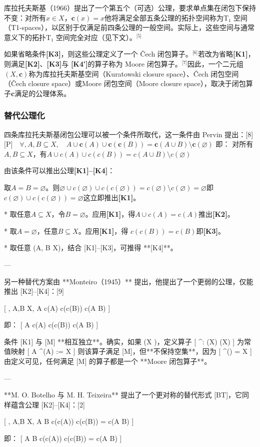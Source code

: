 库拉托夫斯基（1966）提出了一个第五个（可选）公理，要求单点集在闭包下保持不变：对所有$ x \in X $，$\mathbf{c}({x}) = {x}$他将满足全部五条公理的拓扑空间称为T₁ 空间（T1-spaces），以区别于仅满足前四条公理的一般空间。实际上，这些空间与通常意义下的拓扑T₁ 空间完全对应（见下文）。\(^\text{[5]}\)

如果省略条件\textbf{[K3]}，则这些公理定义了一个 Čech 闭包算子。\(^\text{[6]}\)若改为省略\textbf{[K1]}，则满足\textbf{[K2]}、\textbf{[K3]}与 \textbf{[K4′]}的算子称为 Moore 闭包算子。\(^\text{[7]}\)因此，一个二元组$(X, \mathbf{c})$称为库拉托夫斯基空间（Kuratowski closure space）、Čech 闭包空间（Čech closure space）或Moore 闭包空间（Moore closure space），取决于闭包算子$\mathbf{c}$满足的公理体系。
\subsubsection{替代公理化}
四条库拉托夫斯基闭包公理可以被一个条件所取代，这一条件由 Pervin 提出：[8]
$\text{[P]}\quad \forall, A,B \subseteq X, \quad A \cup \mathbf{c}(A) \cup \mathbf{c}(\mathbf{c}(B)) = \mathbf{c}(A \cup B) \setminus \mathbf{c}(\varnothing)$
即：
对所有$A, B \subseteq X$，有$A \cup c(A) \cup c(c(B)) = c(A \cup B) \setminus c(\varnothing)$

由该条件可以推出公理\textbf{[K1]–[K4]}：

取$A = B = \varnothing$。则$\varnothing \cup c(\varnothing) \cup c(c(\varnothing)) = c(\varnothing) \setminus c(\varnothing) = \varnothing$即$c(\varnothing) \cup c(c(\varnothing)) = \varnothing$这立即推出\textbf{[K1]}。

* 取任意$A \subseteq X$，令$B = \varnothing$。应用\textbf{[K1]}，得$
  A \cup c(A) = c(A)$推出\textbf{[K2]}。

* 取$A = \varnothing$，任意$B \subseteq X$。应用\textbf{[K1]}，得
$c(c(B)) = c(B)$即\textbf{[K3]}。

* 取任意 (A, B \subseteq X)，结合 [K1]–[K3]，可推得 **[K4]**。

---

另一种替代方案由 **Monteiro（1945）** 提出，他提出了一个更弱的公理，仅能推出 [K2]–[K4]：[9]

[
\text{[M]}\quad \forall, A,B \subseteq X, \quad A \cup c(A) \cup c(c(B)) \subseteq c(A \cup B)
]

即：
[
A \cup c(A) \cup c(c(B)) \subseteq c(A \cup B)
]

条件 [K1] 与 [M] **相互独立**。确实，如果 (X \neq \varnothing)，定义算子
[
^\star : \wp(X) \to \wp(X)
]
为常值映射
[
A \mapsto {}^\star(A) := X
]
则该算子满足 [M]，但**不保持空集**，因为
[
^\star(\varnothing) = X
]
由定义可见，任何满足 [M] 的算子都是一个 **Moore 闭包算子**。

---

**M. O. Botelho 与 M. H. Teixeira** 提出了一个更对称的替代形式 [BT]，它同样蕴含公理 [K2]–[K4]：[2]

[
\text{[BT]}\quad \forall, A,B \subseteq X, \quad A \cup B \cup c(c(A)) \cup c(c(B)) = c(A \cup B)
]

即：
[
A \cup B \cup c(c(A)) \cup c(c(B)) = c(A \cup B)
]
